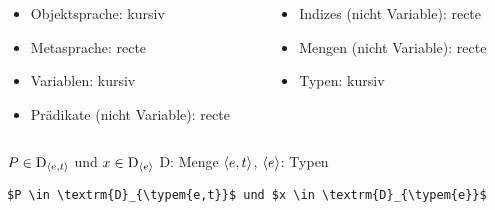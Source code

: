 \begin{frame}[fragile]

\begin{columns}
	\begin{column}[t]{.5\textwidth}
		\begin{itemize}
			\item Objektsprache: kursiv
			\item Metasprache: recte
			\item Variablen: kursiv
			\item Prädikate (nicht Variable): recte
		\end{itemize}	
		
	\end{column}
	\begin{column}[t]{.5\textwidth}
		
		\begin{itemize}
			\item Indizes (nicht Variable): recte	
			\item Mengen (nicht Variable): recte
			\item Typen: kursiv
		\end{itemize}	
		
	\end{column}
\end{columns}


\ea $P \in \textrm{D}_{\langle e,t \rangle}$ und $x \in \textrm{D}_{\langle e \rangle}$
	\ea \textrm{D}: Menge
	\ex $\langle e,t \rangle$, $\langle e \rangle$: Typen
	\z 
\z 

\pause 

{\footnotesize
\begin{lstlisting}
$P \in \textrm{D}_{\typem{e,t}}$ und $x \in \textrm{D}_{\typem{e}}$
\end{lstlisting}
}

\end{frame}



